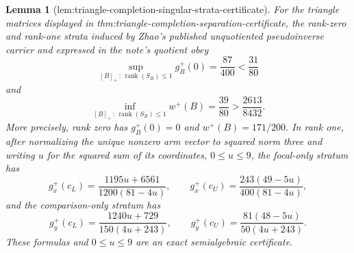 \documentclass{article}
\newtheorem{lemma}{Lemma}
\begin{document}
\begin{lemma}[lem:triangle-completion-singular-strata-certificate]\label{lem:triangle-completion-singular-strata-certificate}
For the triangle matrices displayed in thm:triangle-completion-separation-certificate, the rank-zero and rank-one strata induced by Zhao's published unquotiented pseudoinverse carrier and expressed in the note's quotient obey
\[
\sup_{[B]_+\,:\,\operatorname{rank}(S_B)\le1}g_B^+(0)
=\frac{87}{400}<\frac{31}{80}
\]
and
\[
\inf_{[B]_+\,:\,\operatorname{rank}(S_B)\le1}w^+(B)
=\frac{39}{80}>\frac{2613}{8432}.
\]
More precisely, rank zero has \(g_B^+(0)=0\) and \(w^+(B)=171/200\).  In rank one, after normalizing the unique nonzero arm vector to squared norm three and writing \(u\) for the squared sum of its coordinates, \(0\le u\le9\), the focal-only stratum has
\[
g_x^+(c_L)=\frac{1195u+6561}{1200(81-4u)},
\qquad g_x^+(c_U)=\frac{243(49-5u)}{400(81-4u)},
\]
and the comparison-only stratum has
\[
g_y^+(c_L)=\frac{1240u+729}{150(4u+243)},
\qquad g_y^+(c_U)=\frac{81(48-5u)}{50(4u+243)}.
\]
These formulas and \(0\le u\le9\) are an exact semialgebraic certificate.
\end{lemma}
\end{document}
